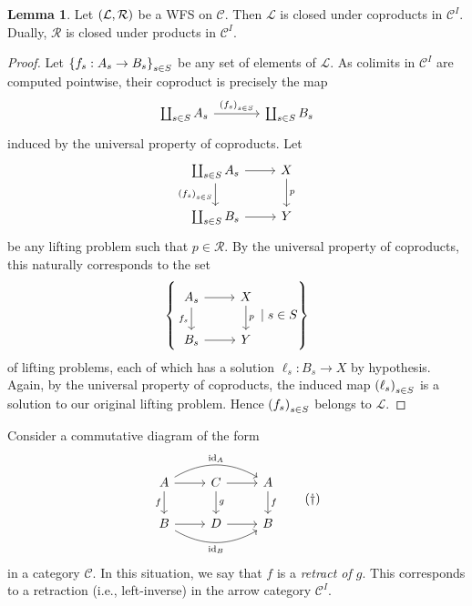 \documentclass[10pt,letterpaper,cm]{nupset}
\theoremstyle{definition}
\theoremstyle{theorem}
\newtheorem{lemma}[definition]{Lemma}
\theoremstyle{remark}
\renewcommand{\L}{\mathcal L}
\newcommand{\RI}{\mathcal R}
\newcommand{\0}{\mathbf{0}}
\newcommand{\1}{\mathbf{1}}
\newcommand{\2}{\mathbf{2}}
\renewcommand{\c}{\mathscr{C}}
\DeclareMathOperator{\idd}{id}
\begin{document}
\begin{lemma}\label{CClem}
Let $\mleft(\L, \RI\mright)$ be a WFS on $\c$. Then $\L$ is closed under coproducts in $\c^I$. Dually, $\RI$ is closed under products in $\c^I$.
\end{lemma}
\begin{proof}
Let $\mleft\{f_s : A_s \to B_s\mright\}_{s\in S}$ be any set of elements of $\L$. As colimits in $\c^I$ are computed pointwise, their coproduct is precisely the map
\[
\begin{tikzcd}[column sep=large]
\coprod_{s\in S}A_s \arrow[r, "\mleft(f_s\mright)_{s\in S}"] & \coprod_{s\in S}B_s
\end{tikzcd}
\] induced by the universal property of coproducts. Let
\[
\begin{tikzcd}
\coprod_{s\in S}A_s \arrow[r] \arrow[d, "\mleft(f_s\mright)_{s\in S}"'] & X \arrow[d, "p"] \\
\coprod_{s\in S}B_s \arrow[r]                                         & Y               
\end{tikzcd}
\] be  any lifting problem such that $p\in \RI$. By the universal property of coproducts, this naturally corresponds to the set
\[
\mleft\{
\begin{tikzcd}
A_s \arrow[r] \arrow[d, "f_s"'] & X \arrow[d, "p"] \\
B_s \arrow[r]                                         & Y               
\end{tikzcd} \mid s\in S
\mright\}
\] of lifting problems, each of which has  a solution $\ell_s: B_s \to X$ by hypothesis. Again, by the universal property of coproducts, the induced map $\mleft(\ell_s\mright)_{s\in S}$ is a solution to our original lifting problem. Hence $\mleft(f_s\mright)_{s\in S}$ belongs to $\L$.
\end{proof}

\medskip

Consider a commutative diagram of the form
\[ \label{eqn:ret}
\begin{tikzcd}
A \arrow[d, "f"'] \arrow[r] \arrow[rr, "\idd_A", bend left] & C \arrow[d, "g"] \arrow[r] & A \arrow[d, "f"] \\
B \arrow[r] \arrow[rr, "\idd_B"', bend right]               & D \arrow[r]                & B               
\end{tikzcd} \tag{$\dagger$}
\] in a category $\c$. In this situation, we say that $f$ is a \textit{retract of $g$}. This corresponds to a retraction (i.e., left-inverse) in the arrow category $\c^I$.
\end{document}

